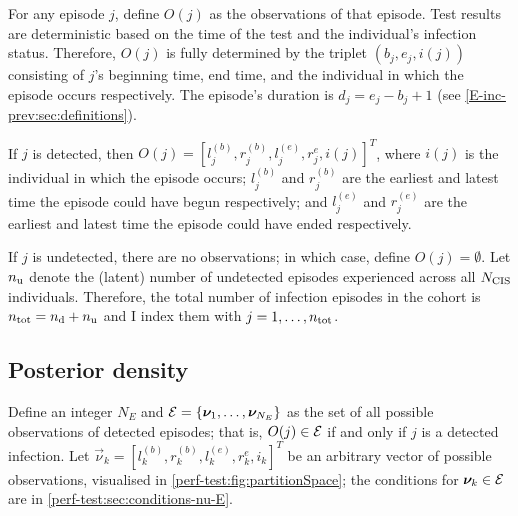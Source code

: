 \documentclass[thesis.tex]{subfiles}
\begin{document}
For any episode $j$, define $O(j)$ as the observations of that episode.
Test results are deterministic based on the time of the test and the individual's infection status.
Therefore, $O(j)$ is fully determined by the triplet $(b_j, e_j, i(j))$ consisting of $j$'s beginning time, end time, and the individual in which the episode occurs respectively.
The episode's duration is $d_j = e_j - b_j + 1$ (see \cref{E-inc-prev:sec:definitions}).

If $j$ is detected, then $O(j) = [l_j^{(b)}, r_j^{(b)}, l_j^{(e)}, r_j^{e}, i(j)]^T$, where $i(j)$ is the individual in which the episode occurs; $l_j^{(b)}$ and $r_j^{(b)}$ are the earliest and latest time the episode could have begun respectively; and $l_j^{(e)}$ and $r_j^{(e)}$ are the earliest and latest time the episode could have ended respectively.

If $j$ is undetected, there are no observations; in which case, define $O(j) = \emptyset$.
Let $n_\text{u}$ denote the (latent) number of undetected episodes experienced across all $N_\text{CIS}$ individuals.
Therefore, the total number of infection episodes in the cohort is $n_\text{tot} = n_\text{d} + n_\text{u}$ and I index them with $j = 1, \dots, n_\text{tot}$.


\subsection{Posterior density} \label{perf-test:sec:posterior}

Define an integer $N_E$ and $\mathcal{E} = \{ \bm{\nu}_1, \dots, \bm{\nu}_{N_E} \}$ as the set of all possible observations of detected episodes; that is, $O(j) \in \mathcal{E}$ if and only if $j$ is a detected infection.
Let $\vec{\nu}_k = [l^{(b)}_k, r^{(b)}_k, l^{(e)}_k, r^{e}_k, i_k]^T$ be an arbitrary vector of possible observations, visualised in \cref{perf-test:fig:partitionSpace}; the conditions for $\bm{\nu}_k \in \mathcal{E}$ are in \cref{perf-test:sec:conditions-nu-E}.
\end{document}
